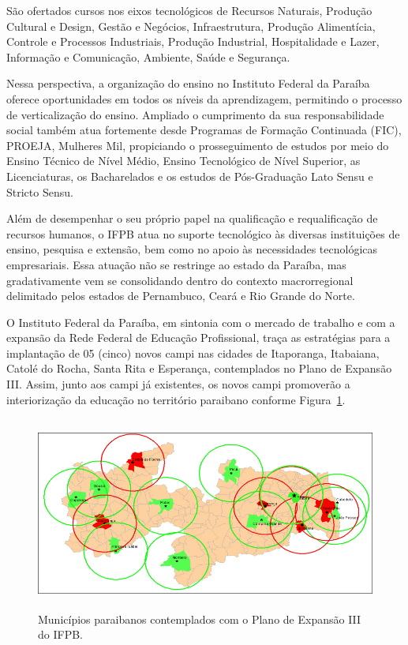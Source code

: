 	São ofertados cursos nos eixos tecnológicos de Recursos Naturais, Produção Cultural e Design, Gestão e Negócios, Infraestrutura, Produção Alimentícia, Controle e Processos Industriais, Produção Industrial, Hospitalidade e Lazer, Informação e Comunicação, Ambiente, Saúde e Segurança.

	Nessa perspectiva, a organização do ensino no Instituto Federal da Paraíba oferece oportunidades em todos os níveis da aprendizagem, permitindo o processo de verticalização do ensino. Ampliado o cumprimento da sua responsabilidade social também atua fortemente desde Programas de Formação Continuada (FIC), PROEJA, Mulheres Mil, propiciando o prosseguimento de estudos por meio do Ensino Técnico de Nível Médio, Ensino Tecnológico de Nível Superior, as Licenciaturas, os Bacharelados e os estudos de Pós-Graduação Lato Sensu e Stricto Sensu.

	Além de desempenhar o seu próprio papel na qualificação e requalificação de recursos humanos, o IFPB atua no suporte tecnológico às diversas instituições de ensino, pesquisa e extensão, bem como no apoio às necessidades tecnológicas empresariais. Essa atuação não se restringe ao estado da Paraíba, mas gradativamente vem se consolidando dentro do contexto macrorregional delimitado pelos estados de Pernambuco, Ceará e Rio Grande do Norte.

	O Instituto Federal da Paraíba, em sintonia com o mercado de trabalho e com a expansão da Rede Federal de Educação Profissional, traça as estratégias para a implantação de 05 (cinco) novos campi nas cidades de Itaporanga, Itabaiana, Catolé do Rocha, Santa Rita e Esperança, contemplados no Plano de Expansão III. Assim, junto aos campi já existentes, os novos campi promover\~ao a interiorização da educação no território paraibano conforme Figura~\ref{fig:IFPB2}.


\begin{figure}
       \centering
       \includegraphics[height=2.5in]{imagens/campiIFPB2.png}
       \caption {Municípios paraibanos contemplados com o Plano de Expansão III do IFPB.}
\label{fig:IFPB2}
\end{figure}

